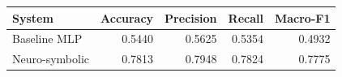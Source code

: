 \begin{tabular}{lrrrr}
\hline
System & Accuracy & Precision & Recall & Macro-F1 \\
\hline
Baseline MLP & 0.5440 & 0.5625 & 0.5354 & 0.4932 \\
Neuro-symbolic & 0.7813 & 0.7948 & 0.7824 & 0.7775 \\
\hline
\end{tabular}
